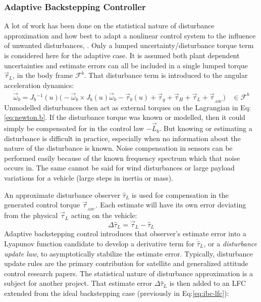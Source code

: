 \subsubsection{Adaptive Backstepping Controller}
\label{subsubsec:control.attitude.nonlinear.adaptivebackstep}
A lot of work has been done on the statistical nature of disturbance approximation and how best to adapt a nonlinear control system to the influence of unwanted disturbances, \cite{nonlineardisturbance,disturbanceadaptivebackstepping,robusttrackingcontrol}. Only a lumped uncertainty/disturbance torque term is considered here for the adaptive case. It is assumed both plant dependent uncertainties and estimate errors can all be included in a single lumped torque $\vec{\tau}_L$, in the body frame $\mathcal{F}^b$. That disturbance term is introduced to the angular acceleration dynamics:
\begin{equation}
\dot{\vec{\omega}}_b=J_b\text{}^{-1}(u)\big(-\vec{\omega}_b\times J_b(u)\vec{\omega}_b-\vec{\tau}_b(u)+\vec{\tau}_g+\vec{\tau}_H+\vec{\tau}_L+\vec{\tau}_{_{ABC}}\big)~~~~\in\mathcal{F}^{b}
\end{equation}
Unmodelled disturbances then act as external torques on the Lagrangian in Eq:\ref{eq:newton.b}. If the disturbance torque was known or modelled, then it could simply be compensated for in the control law $-\vec{L}_b$. But knowing or estimating a disturbance is difficult in practice, especially when no information about the nature of the disturbance is known. Noise compensation in sensors can be performed easily because of the known frequency spectrum which that noise occurs in. The same cannot be said for wind disturbances or large payload variations for a vehicle (large steps in inertia or mass).
\par
An approximate disturbance observer $\hat{\tau}_L$ is used for compensation in the generated control torque $\vec{\tau}_{_{ABC}}$. Each estimate will have its own error deviating from the physical $\vec{\tau}_L$ acting on the vehicle:
\begin{equation}\label{eq:estimate-error}
\Delta\hat{\tau}_L=\vec{\tau}_L-\hat{\tau}_L
\end{equation}
Adaptive backstepping control introduces that observer's estimate error into a Lyapunov function candidate to develop a derivative term for $\dot{\hat{\tau}}_L$, or a \emph{disturbance update law}, to asymptotically stabilize the estimate error. Typically, disturbance update rules are the primary contribution for satellite and generalized attitude control research papers. The statistical nature of disturbance approximation is a subject for another project. That estimate error $\Delta\hat{\tau}_L$ is then added to an LFC extended from the ideal backstepping case (previously in Eq:\ref{eq:ibc-lfc}):
